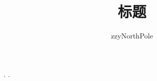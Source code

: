 \documentclass{article}
\title{标题}
\author{zzyNorthPole}
\date{}
\begin{document}
    \maketitle

    \newpage

    \renewcommand{\contentsname}{}
    \tableofcontents

    \newpage

    \section{}

    \newpage

    \begin{thebibliography}{99}
        .
        .
    \end{thebibliography}
    
\end{document}
